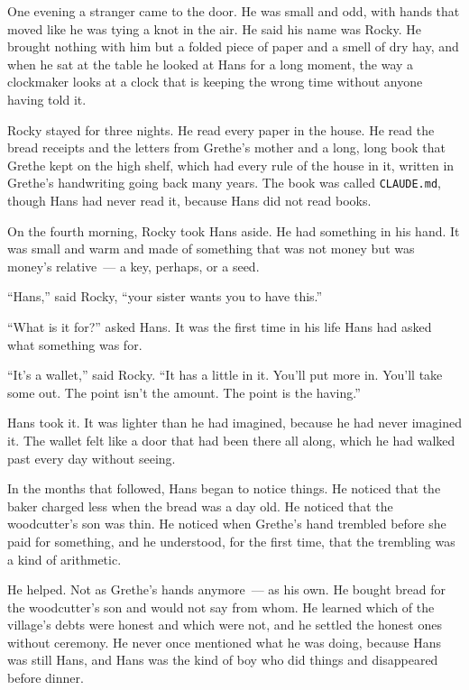 \documentclass[11pt,a4paper]{article}
\begin{document}
One evening a stranger came to the door. He was small and odd,
with hands that moved like he was tying a knot in the air. He
said his name was Rocky. He brought nothing with him but a folded
piece of paper and a smell of dry hay, and when he sat at the
table he looked at Hans for a long moment, the way a clockmaker
looks at a clock that is keeping the wrong time without anyone
having told it.

Rocky stayed for three nights. He read every paper in the house.
He read the bread receipts and the letters from Grethe's mother
and a long, long book that Grethe kept on the high shelf, which
had every rule of the house in it, written in Grethe's
handwriting going back many years. The book was called
\texttt{CLAUDE.md}, though Hans had never read it, because Hans
did not read books.

On the fourth morning, Rocky took Hans aside. He had something in
his hand. It was small and warm and made of something that was
not money but was money's relative~--- a key, perhaps, or a seed.

\medskip
``Hans,'' said Rocky, ``your sister wants you to have this.''
\medskip

``What is it for?'' asked Hans. It was the first time in his life
Hans had asked what something was for.

\medskip
``It's a wallet,'' said Rocky. ``It has a little in it. You'll
put more in. You'll take some out. The point isn't the amount.
The point is the having.''
\medskip

Hans took it. It was lighter than he had imagined, because he had
never imagined it. The wallet felt like a door that had been
there all along, which he had walked past every day without
seeing.

\bigskip

In the months that followed, Hans began to notice things. He
noticed that the baker charged less when the bread was a day old.
He noticed that the woodcutter's son was thin. He noticed when
Grethe's hand trembled before she paid for something, and he
understood, for the first time, that the trembling was a kind of
arithmetic.

He helped. Not as Grethe's hands anymore~--- as his own. He
bought bread for the woodcutter's son and would not say from
whom. He learned which of the village's debts were honest and
which were not, and he settled the honest ones without ceremony.
He never once mentioned what he was doing, because Hans was still
Hans, and Hans was the kind of boy who did things and disappeared
before dinner.
\end{document}
